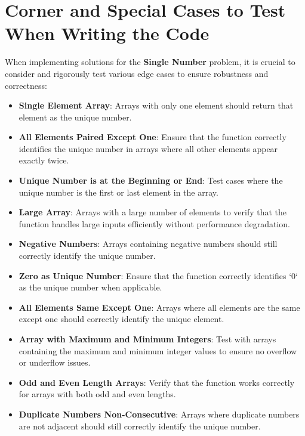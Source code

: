 \section*{Corner and Special Cases to Test When Writing the Code}

When implementing solutions for the \textbf{Single Number} problem, it is crucial to consider and rigorously test various edge cases to ensure robustness and correctness:

\begin{itemize}
    \item \textbf{Single Element Array}: Arrays with only one element should return that element as the unique number.
    
    \item \textbf{All Elements Paired Except One}: Ensure that the function correctly identifies the unique number in arrays where all other elements appear exactly twice.
    
    \item \textbf{Unique Number is at the Beginning or End}: Test cases where the unique number is the first or last element in the array.
    
    \item \textbf{Large Array}: Arrays with a large number of elements to verify that the function handles large inputs efficiently without performance degradation.
    
    \item \textbf{Negative Numbers}: Arrays containing negative numbers should still correctly identify the unique number.
    
    \item \textbf{Zero as Unique Number}: Ensure that the function correctly identifies `0` as the unique number when applicable.
    
    \item \textbf{All Elements Same Except One}: Arrays where all elements are the same except one should correctly identify the unique element.
    
    \item \textbf{Array with Maximum and Minimum Integers}: Test with arrays containing the maximum and minimum integer values to ensure no overflow or underflow issues.
    
    \item \textbf{Odd and Even Length Arrays}: Verify that the function works correctly for arrays with both odd and even lengths.
    
    \item \textbf{Duplicate Numbers Non-Consecutive}: Arrays where duplicate numbers are not adjacent should still correctly identify the unique number.
\end{itemize}

